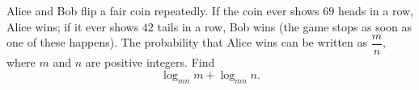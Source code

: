 Alice and Bob flip a fair coin repeatedly. If the coin ever shows $69$ heads in a row, Alice wins; if it ever shows $42$ tails in a row, Bob wins (the game stops as soon as one of these happens). The probability that Alice wins can be written as $\dfrac mn$, where $m$ and $n$ are positive integers. Find
\[\log_{mn}m+\log_{mn}n.\]
